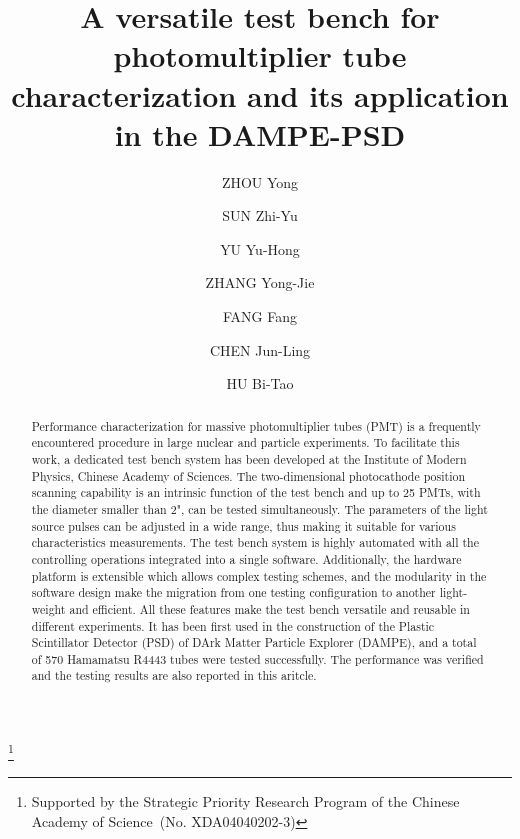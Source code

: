 \documentclass{nst}
\begin{document}
\title{A versatile test bench for photomultiplier tube characterization and its application in the DAMPE-PSD}\thanks{Supported by the Strategic Priority Research Program of the Chinese Academy of Science~(No. XDA04040202-3)}

\author[周勇]{ZHOU Yong}
\author[孙志宇]{SUN Zhi-Yu}
\author[余玉洪]{YU Yu-Hong}
\author[张永杰]{ZHANG Yong-Jie}
\author[方芳]{FANG Fang}
\author[陈俊岭]{CHEN Jun-Ling}
\author[胡碧涛]{HU Bi-Tao}


\begin{abstract}
 Performance characterization for massive photomultiplier tubes (PMT) is a frequently encountered procedure in large nuclear and particle experiments. To facilitate this work, a dedicated test bench system has been developed at the Institute of Modern Physics, Chinese Academy of Sciences.
 The two-dimensional photocathode position scanning capability is an intrinsic function of the test bench and up to 25 PMTs, with the diameter smaller than 2", can be tested simultaneously.
 The parameters of the light source pulses can be adjusted in a wide range, thus making it suitable for various characteristics measurements.
 The test bench system is highly automated with all the controlling operations integrated into a single software. 
 Additionally, the hardware platform is extensible which allows complex testing schemes, and the modularity in the software design make the migration from one testing configuration to another light-weight and efficient.
 All these features make the test bench versatile and reusable in different experiments.
 It has been first used in the construction of the Plastic Scintillator Detector (PSD) of DArk Matter Particle Explorer (DAMPE), and a total of 570 Hamamatsu R4443 tubes were tested successfully. The performance was verified and the testing results are also reported in this aritcle.
\end{abstract}
\end{document}
